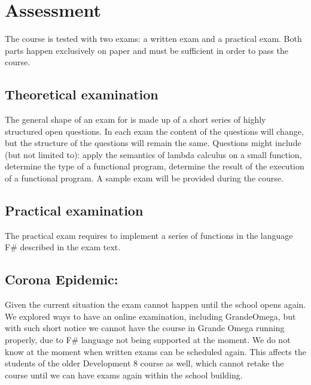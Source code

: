 \section{Assessment}
The course is tested with two exams: a written exam and a practical exam. Both parts happen exclusively on paper and must be sufficient in order to pass the course.

\subsection{Theoretical examination \modulecode}
The general shape of an exam for \texttt{\modulecode} is made up of a short series of highly structured open questions.
In each exam the content of the questions will change, but the structure of the questions will remain the same. Questions might include (but not limited to): apply the semantics of lambda calculus on a small function, determine the type of a functional program, determine the result of the execution of a functional program. A sample exam will be provided during the course.

\subsection{Practical examination \modulecode}
The practical exam requires to implement a series of functions in the language F\# described in the exam text.

\subsection{Corona Epidemic:}
Given the current situation the exam cannot happen until the school opens again. We explored ways to have an online examination, including GrandeOmega, but with such short notice we cannot have the course in Grande Omega running properly, due to F\# language not being supported at the moment. We do not know at the moment when written exams can be scheduled again. This affects the students of the older Development 8 course as well, which cannot retake the course until we can have exams again within the school building.
